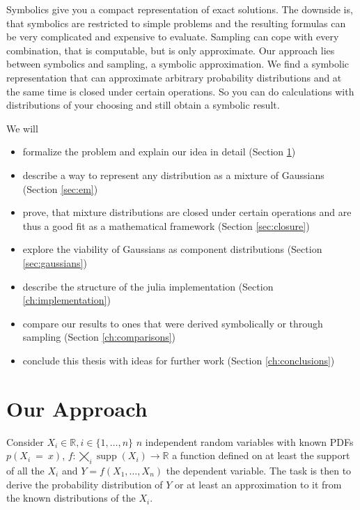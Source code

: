 \documentclass[11pt,a4paper]{book}
\DeclareMathOperator{\supp}{supp}
\begin{document}
Symbolics give you a compact representation of exact solutions. The downside is,
that symbolics are restricted to simple problems and the resulting formulas can
be very complicated and expensive to evaluate. Sampling can cope with every
combination, that is computable, but is only approximate. Our approach lies
between symbolics and sampling, a symbolic approximation. We find a symbolic
representation that can approximate arbitrary probability distributions and at
the same time is closed under certain operations. So you can do calculations
with distributions of your choosing and still obtain a symbolic result.

We will
\begin{itemize}
\item formalize the problem and explain our idea in detail (Section
  \ref{ch:idea})
\item describe a way to represent any distribution as a mixture of Gaussians
  (Section \ref{sec:em})
\item prove, that mixture distributions are closed under certain operations and
  are thus a good fit as a mathematical framework (Section \ref{sec:closure})
\item explore the viability of Gaussians as component distributions (Section
  \ref{sec:gaussians})
\item describe the structure of the julia implementation (Section
  \ref{ch:implementation})
\item compare our results to ones that were derived symbolically or through
  sampling (Section \ref{ch:comparisons})
\item conclude this thesis with ideas for further work (Section
  \ref{ch:conclusions})
\end{itemize}

\chapter{Our Approach}
\label{ch:idea}

Consider $X_{i} \in \mathbb{R}, i \in \{ 1, \dots, n \}$ $n$ independent random
variables with known PDFs $p(X_{i}~=~x)$,
$f : \bigtimes_{i} \supp(X_{i}) \rightarrow \mathbb{R}$ a function defined on at
least the support of all the $X_{i}$ and $Y = f(X_{1}, \dots, X_{n})$ the
dependent variable. The task is then to derive the probability distribution of
$Y$ or at least an approximation to it from the known distributions of the
$X_{i}$.
\end{document}

